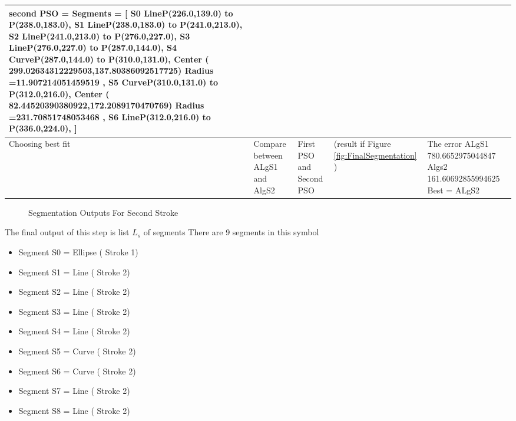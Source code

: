 \begin{landscape}
\begin{scriptsize}
\begin{longtable}{|p{2cm}|p{2cm}|p{2cm}|p{2cm}|p{13cm}|}
  second PSO =   Segments = [   S0 Line{P(226.0,139.0) to P(238.0,183.0)},      S1 Line{P(238.0,183.0) to P(241.0,213.0)},      S2 Line{P(241.0,213.0) to P(276.0,227.0)},      S3 Line{P(276.0,227.0) to P(287.0,144.0)},      S4 Curve{P(287.0,144.0) to P(310.0,131.0),  Center ( 299.02634312229503,137.80386092517725) Radius =11.907214051459519 },  S5 Curve{P(310.0,131.0) to P(312.0,216.0),  Center ( 82.44520390380922,172.2089170470769) Radius =231.70851748053468 },  S6 Line{P(312.0,216.0) to P(336.0,224.0)}, ]  
  
 
 \\ \hline 
Choosing best fit & Compare between ALgS1 and AlgS2 &  First PSO and Second PSO  &  (result if Figure \ref{fig:FinalSegmentation} ) & 
   The error ALgS1 780.6652975044847  Algs2 161.60692855994625    Best = ALgS2  \\ \hline 
 
 
		\end{longtable}




\end{scriptsize}

\end{landscape}


\begin{figure}
	\centering
	
	\caption{Segmentation Outputs For Second Stroke}
\end{figure}
 

The final output of this step is list $L_s$ of segments There are  9  segments in this symbol

\begin{itemize}
	\item    Segment S0  = Ellipse ( Stroke 1)
   \item Segment S1  =   Line ( Stroke 2)
     \item  Segment S2 = Line ( Stroke 2)
     \item  Segment S3  =  Line ( Stroke 2)
     \item Segment S4  =   Line ( Stroke 2)
  \item    Segment S5  =  Curve  ( Stroke 2)
     \item  Segment S6  =  Curve  ( Stroke 2)
     \item  Segment S7  =  Line   ( Stroke 2)
     \item  Segment S8  =  Line   ( Stroke 2)
\end{itemize}


